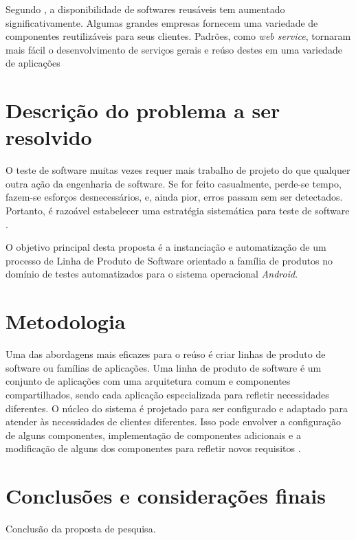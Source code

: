 \documentclass[10pt,a4paper]{article}
\begin{document}
Segundo \cite{Sommerville2011}, a disponibilidade de softwares reusáveis tem aumentado significativamente. Algumas grandes empresas fornecem uma variedade de componentes reutilizáveis para seus clientes. Padrões, como \textit{web service}, tornaram mais fácil o desenvolvimento de serviços gerais e reúso destes em uma variedade de aplicações

\section{Descrição do problema a ser resolvido}
O teste de software muitas vezes requer mais trabalho de projeto do que qualquer outra ação da engenharia de software. Se for feito casualmente, perde-se tempo, fazem-se esforços desnecessários, e, ainda pior, erros passam sem ser detectados. Portanto, é razoável estabelecer uma estratégia sistemática para teste de software \cite{pressman2011}.

O objetivo principal desta proposta é a instanciação e automatização de um processo de Linha de Produto de Software orientado a família de produtos no domínio de testes automatizados para o sistema operacional \textit{Android}.
\section{Metodologia}
Uma das abordagens mais eficazes para o reúso é criar linhas de produto de software ou famílias de aplicações. Uma linha de produto de software é um conjunto de aplicações com uma arquitetura comum e componentes compartilhados, sendo cada aplicação especializada para refletir necessidades diferentes. O núcleo do sistema é projetado para ser configurado e adaptado para atender às necessidades de clientes diferentes. Isso pode envolver a configuração de alguns componentes, implementação de componentes adicionais e a modificação de alguns dos componentes para refletir novos requisitos \cite{Sommerville2011}.

\section{Conclusões e considerações finais}
Conclusão da proposta de pesquisa.

\newpage


\end{document}
